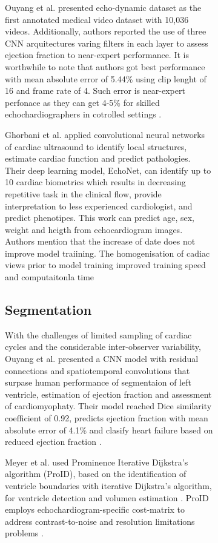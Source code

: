 \begin{figure}[H]
\begin{figure}[H]
Ouyang et al. presented echo-dynamic dataset as the first annotated medical video dataset with 10,036 videos. 
Additionally, authors reported the use of three CNN arquitectures varing filters in each layer to assess ejection fraction to near-expert performance.
It is worthwhile to note that authors got best performance with mean absolute error of 5.44\% using clip lenght of 16 and frame rate of 4.
Such error is near-expert perfonace as they can get 4-5\% for skilled echochardiographers in cotrolled settings \cite{ouyang-NeuripsML4H2019}.


Ghorbani et al. applied convolutional neural networks of cardiac ultrasound to identify local structures, estimate cardiac function and predict pathologies.
Their deep learning model, EchoNet, can identify up to 10 cardiac biometrics which results in decreasing repetitive task in the clinical flow, provide interpretation to less experienced cardiologist, and predict phenotipes. This work can predict age, sex, weight and heigth from echocardiogram images. 
Authors mention that the increase of date does not improve model traiining. The homogenisation of cadiac views prior to model training improved training speed and computaitonla time \cite{Ghorbani-DigitalMedicineNature-JAN2020}


\subsection{Segmentation}
With the challenges of limited sampling of cardiac cycles and the considerable inter-observer variability, Ouyang et al. presented a CNN model with residual connections and spatiotemporal convolutions that surpase human performance of segmentaion of left ventricle, estimation of ejection fraction and assessment of cardiomyophaty. 
Their model reached Dice similarity coefficient of 0.92, predicts ejection fraction with mean absolute error of 4.1\% and clasify heart failure based on reduced ejection fraction 
\cite{Ouyang-Nature-APR2020}.


Meyer et al. used Prominence Iterative Dijkstra’s algorithm (ProID), based on the identification of ventricle boundaries with iterative Dijkstra's algorithm, for ventricle detection and volumen estimation \cite{Meyers2020}.
ProID employs echochardiogram-specific cost-matrix to address contrast-to-noise and resolution limitations problems \cite{brindise2020unsupervised}.



\end{figure}
\end{figure}
